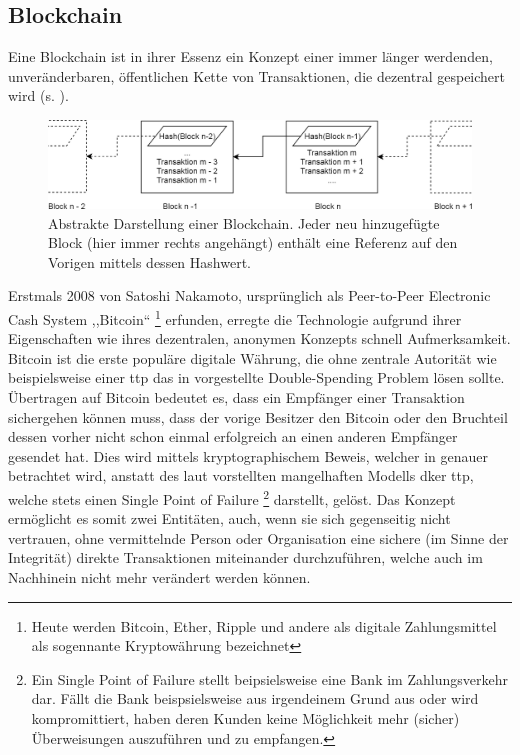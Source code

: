 \subsection{Blockchain}
\label{sec:sota_blockchain}
    Eine Blockchain ist in ihrer Essenz ein Konzept einer immer länger werdenden, unveränderbaren, öffentlichen Kette von Transaktionen, die dezentral gespeichert wird (s. ). 
    \smallskip
    \begin{figure}[H]
    	\centering
    	\includegraphics[width=\textwidth]{graphics/bc_highlvl.png}
    	\caption[Abstrakte Darstellung einer Blockchain]{Abstrakte Darstellung einer Blockchain. Jeder neu hinzugefügte Block (hier immer rechts angehängt) enthält eine Referenz auf den Vorigen mittels dessen Hashwert.}
    	\label{fig:bc_highlvl}
    \end{figure}
    \noindent Erstmals 2008 von Satoshi Nakamoto, ursprünglich als Peer-to-Peer Electronic Cash System ,,Bitcoin``
    \!\footnote{Heute werden Bitcoin, Ether, Ripple und andere als digitale Zahlungsmittel als sogennante Kryptowährung bezeichnet} 
    erfunden, erregte die Technologie aufgrund ihrer Eigenschaften wie ihres dezentralen, anonymen Konzepts schnell Aufmerksamkeit. 
    Bitcoin ist die erste populäre digitale Währung, die ohne zentrale Autorität wie beispielsweise einer \gls{ttp} das in  vorgestellte Double-Spending Problem lösen sollte\cite{Nakamoto2008}. 
    Übertragen auf Bitcoin bedeutet es, dass ein Empfänger einer Transaktion sichergehen können muss, dass der vorige Besitzer den Bitcoin oder den Bruchteil dessen vorher nicht schon einmal erfolgreich an einen anderen Empfänger gesendet hat.
    Dies wird mittels kryptographischem Beweis, welcher in  genauer betrachtet wird, anstatt des laut \citeauthor{Nakamoto2008} vorstellten mangelhaften Modells dker \gls{ttp}, welche stets einen Single Point of Failure
    \!\footnote{Ein Single Point of Failure stellt beipsielsweise eine Bank im Zahlungsverkehr dar.
    Fällt die Bank beispsielsweise aus irgendeinem Grund aus oder wird kompromittiert, haben deren Kunden keine Möglichkeit mehr (sicher) Überweisungen auszuführen und zu empfangen.}
    darstellt, gelöst. 
    Das Konzept ermöglicht es somit zwei Entitäten, auch, wenn sie sich gegenseitig nicht vertrauen, ohne vermittelnde Person oder Organisation eine sichere (im Sinne der Integrität) direkte Transaktionen miteinander durchzuführen, welche auch im Nachhinein nicht mehr verändert werden können.\cite{Christidis2016}
    
